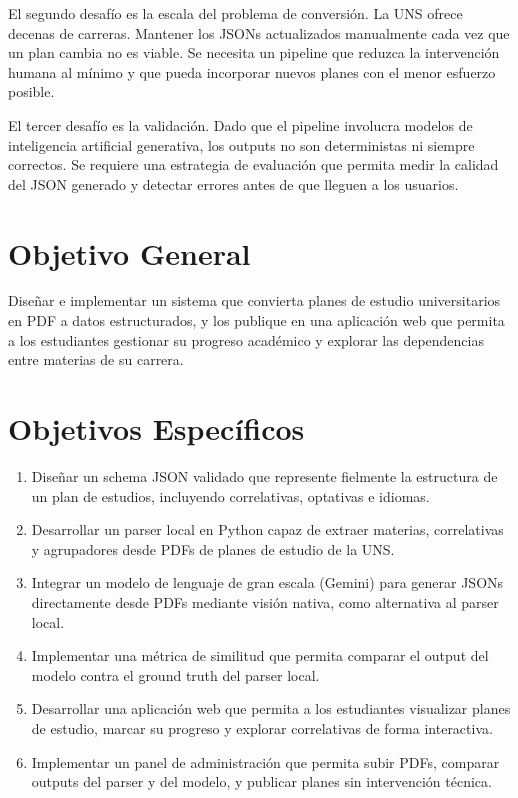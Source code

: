 \documentclass[12pt, a4paper]{report}
\begin{document}
El segundo desafío es la escala del problema de conversión. La UNS ofrece decenas de
carreras. Mantener los JSONs actualizados manualmente cada vez que un plan cambia no es
viable. Se necesita un pipeline que reduzca la intervención humana al mínimo y que pueda
incorporar nuevos planes con el menor esfuerzo posible.

El tercer desafío es la validación. Dado que el pipeline involucra modelos de inteligencia
artificial generativa, los outputs no son deterministas ni siempre correctos. Se requiere
una estrategia de evaluación que permita medir la calidad del JSON generado y detectar
errores antes de que lleguen a los usuarios.

\section{Objetivo General}

Diseñar e implementar un sistema que convierta planes de estudio universitarios en PDF a
datos estructurados, y los publique en una aplicación web que permita a los estudiantes
gestionar su progreso académico y explorar las dependencias entre materias de su carrera.

\section{Objetivos Específicos}

\begin{enumerate}
  \item Diseñar un schema JSON validado que represente fielmente la estructura de un plan de
        estudios, incluyendo correlativas, optativas e idiomas.
  \item Desarrollar un parser local en Python capaz de extraer materias, correlativas y
        agrupadores desde PDFs de planes de estudio de la UNS.
  \item Integrar un modelo de lenguaje de gran escala (Gemini) para generar JSONs
        directamente desde PDFs mediante visión nativa, como alternativa al parser local.
  \item Implementar una métrica de similitud que permita comparar el output del modelo
        contra el ground truth del parser local.
  \item Desarrollar una aplicación web que permita a los estudiantes visualizar planes de
        estudio, marcar su progreso y explorar correlativas de forma interactiva.
  \item Implementar un panel de administración que permita subir PDFs, comparar outputs del
        parser y del modelo, y publicar planes sin intervención técnica.
\end{enumerate}
\end{document}
